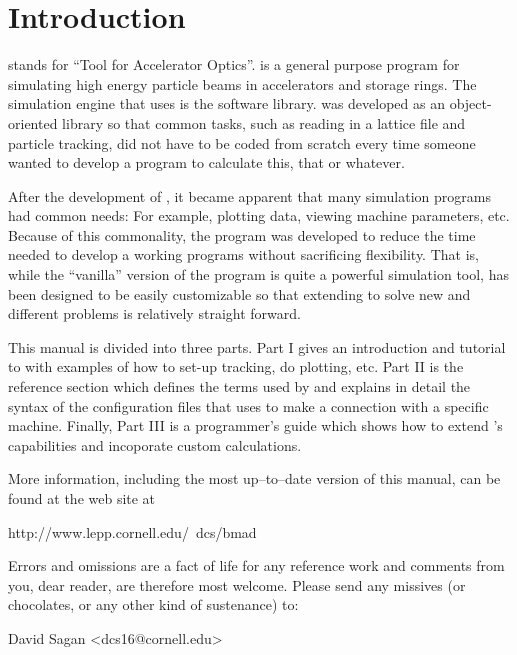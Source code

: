 \section*{Introduction}

\tao stands for ``Tool for Accelerator Optics''. \tao is a general
purpose program for simulating high energy particle beams in
accelerators and storage rings. The simulation engine that \tao uses
is the \bmad software library\cite{b:bmad}. \bmad was developed as an
object-oriented library so that common tasks, such as reading in a
lattice file and particle tracking, did not have to be coded from
scratch every time someone wanted to develop a program to calculate
this, that or whatever.

After the development of \bmad, it became apparent that many simulation
programs had common needs: For example, plotting data, viewing machine
parameters, etc. Because of this commonality, the \tao program was
developed to reduce the time needed to develop a working programs
without sacrificing flexibility. That is, while the ``vanilla''
version of the \tao program is quite a powerful simulation tool, \tao
has been designed to be easily customizable so that extending \tao to
solve new and different problems is relatively straight forward.

This manual is divided into three parts. Part I gives an introduction
and tutorial to \tao with examples of how to set-up tracking, do plotting,
etc. Part II is the reference section which defines the terms used by
\tao and explains in detail the syntax of the configuration files that
\tao uses to make a connection with a specific machine. Finally, Part
III is a programmer's guide which shows how to extend \tao's capabilities
and incoporate custom calculations.

More information, including the most up--to--date version of this
manual, can be found at the \bmad web site at
\begin{example}
  http://www.lepp.cornell.edu/~dcs/bmad
\end{example}

Errors and omissions are a fact of life for any reference work and
comments from you, dear reader, are therefore most welcome. Please
send any missives (or chocolates, or any other kind of sustenance) to:
\begin{example}
  David Sagan <dcs16@cornell.edu>
\end{example}
